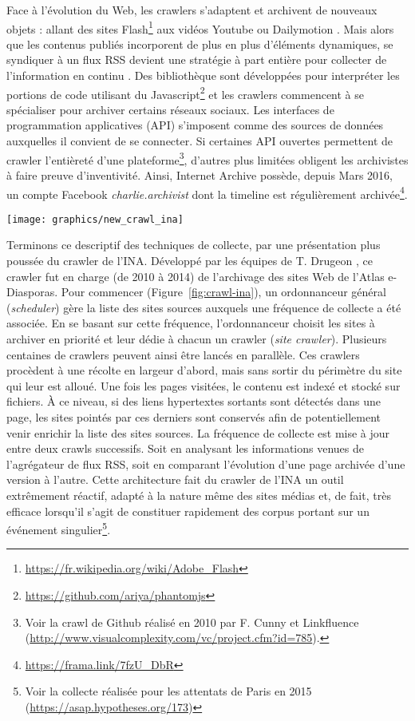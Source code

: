 \documentclass[symmetric,justified,marginals=raggedouter]{tufte-book}
\begin{document}
Face à l'évolution du Web, les crawlers s'adaptent et archivent de nouveaux objets : allant des sites Flash\footnote{\RaggedOuter \url{https://fr.wikipedia.org/wiki/Adobe_Flash}} aux vidéos Youtube ou Dailymotion \citep{pop_archiving_2010}. Mais alors que les contenus publiés incorporent de plus en plus d'éléments dynamiques, se syndiquer à un flux RSS devient une stratégie à part entière pour collecter de l'information en continu \citep{oita_archiving_2010}. Des bibliothèque sont développées pour interpréter les portions de code utilisant du Javascript\footnote{\RaggedOuter \url{https://github.com/ariya/phantomjs}} et les crawlers commencent à se spécialiser pour archiver certains réseaux sociaux. Les interfaces de programmation applicatives (API) s'imposent comme des sources de données auxquelles il convient de se connecter. Si certaines API ouvertes permettent de crawler l'entièreté d'une plateforme\footnote{\RaggedOuter Voir la crawl de Github réalisé en 2010 par F. Cunny et Linkfluence (\url{http://www.visualcomplexity.com/vc/project.cfm?id=785}).}, d'autres plus limitées obligent les archivistes à faire preuve d'inventivité. Ainsi, Internet Archive possède, depuis Mars 2016, un compte Facebook \textit{charlie.archivist} dont la timeline est régulièrement archivée\footnote{\RaggedOuter \url{https://frama.link/7fzU_DbR}}. 

\begin{figure*}%
  \texttt{[image: graphics/new\_crawl\_ina]}
  \caption{Fonctionnement général du système de collecte de l'INA}
  \label{fig:crawl-ina}
\end{figure*}

\noindent Terminons ce descriptif des techniques de collecte, par une présentation plus poussée du crawler de l'INA. Développé par les équipes de T. Drugeon \citep{drugeon_technical_2005}, ce crawler fut en charge (de 2010 à 2014) de l'archivage des sites Web de l'Atlas e-Diasporas. Pour commencer (Figure~\ref{fig:crawl-ina}), un ordonnanceur général (\textit{scheduler}) gère la liste des sites sources auxquels une fréquence de collecte a été associée. En se basant sur cette fréquence, l'ordonnanceur choisit les sites à archiver en priorité et leur dédie à chacun un crawler (\textit{site crawler}). Plusieurs centaines de crawlers peuvent ainsi être lancés en parallèle. Ces crawlers procèdent à une récolte en largeur d'abord, mais sans sortir du périmètre du site qui leur est alloué. Une fois les pages visitées, le contenu est indexé et stocké sur fichiers. À ce niveau, si des liens hypertextes sortants sont détectés dans une page, les sites pointés par ces derniers sont conservés afin de potentiellement venir enrichir la liste des sites sources. La fréquence de collecte est mise à jour entre deux crawls successifs. Soit en analysant les informations venues de l'agrégateur de flux RSS, soit en comparant l'évolution d'une page archivée d'une version à l'autre. Cette architecture fait du crawler de l'INA un outil extrêmement réactif, adapté à la nature même des sites médias et, de fait, très efficace lorsqu'il s'agit de constituer rapidement des corpus portant sur un événement singulier\footnote{\RaggedOuter Voir la collecte réalisée pour les attentats de Paris en 2015 (\url{https://asap.hypotheses.org/173})}.
\end{document}
